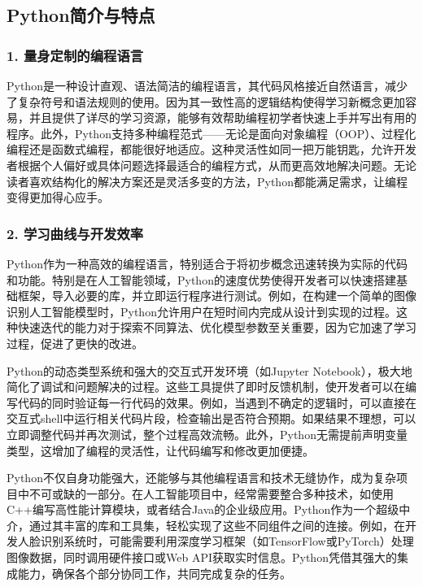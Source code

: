 \subsection{Python简介与特点}

\subsubsection{1. 量身定制的编程语言}

Python是一种设计直观、语法简洁的编程语言，其代码风格接近自然语言，减少了复杂符号和语法规则的使用。因为其一致性高的逻辑结构使得学习新概念更加容易，并且提供了详尽的学习资源，能够有效帮助编程初学者快速上手并写出有用的程序。此外，Python支持多种编程范式——无论是面向对象编程（OOP）、过程化编程还是函数式编程，都能很好地适应。这种灵活性如同一把万能钥匙，允许开发者根据个人偏好或具体问题选择最适合的编程方式，从而更高效地解决问题。无论读者喜欢结构化的解决方案还是灵活多变的方法，Python都能满足需求，让编程变得更加得心应手。

\subsubsection{2. 学习曲线与开发效率}

Python作为一种高效的编程语言，特别适合于将初步概念迅速转换为实际的代码和功能。特别是在人工智能领域，Python的速度优势使得开发者可以快速搭建基础框架，导入必要的库，并立即运行程序进行测试。例如，在构建一个简单的图像识别人工智能模型时，Python允许用户在短时间内完成从设计到实现的过程。这种快速迭代的能力对于探索不同算法、优化模型参数至关重要，因为它加速了学习过程，促进了更快的改进。

Python的动态类型系统和强大的交互式开发环境（如Jupyter Notebook），极大地简化了调试和问题解决的过程。这些工具提供了即时反馈机制，使开发者可以在编写代码的同时验证每一行代码的效果。例如，当遇到不确定的逻辑时，可以直接在交互式shell中运行相关代码片段，检查输出是否符合预期。如果结果不理想，可以立即调整代码并再次测试，整个过程高效流畅。此外，Python无需提前声明变量类型，这增加了编程的灵活性，让代码编写和修改更加便捷。

Python不仅自身功能强大，还能够与其他编程语言和技术无缝协作，成为复杂项目中不可或缺的一部分。在人工智能项目中，经常需要整合多种技术，如使用C++编写高性能计算模块，或者结合Java的企业级应用。Python作为一个超级中介，通过其丰富的库和工具集，轻松实现了这些不同组件之间的连接。例如，在开发人脸识别系统时，可能需要利用深度学习框架（如TensorFlow或PyTorch）处理图像数据，同时调用硬件接口或Web API获取实时信息。Python凭借其强大的集成能力，确保各个部分协同工作，共同完成复杂的任务。

